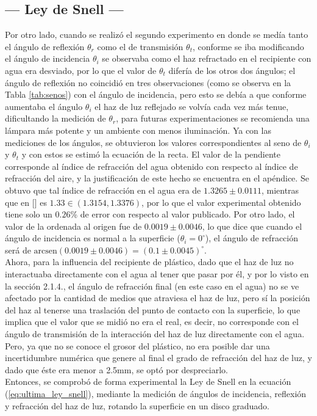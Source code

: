\documentclass[12pt,a4paper]{article}
\begin{document}
\subsection{--- Ley de Snell ---} %
\label{sub:ley_snell_conc}
Por otro lado, cuando se realizó el segundo experimento en donde se medía tanto el ángulo de reflexión $\theta_r$ como el de transmisión $\theta_t$, conforme se iba modificando el ángulo de incidencia $\theta_i$ se observaba como el haz refractado en el recipiente con agua era desviado, por lo que el valor de $\theta_t$ difería de los otros dos ángulos; el ángulo de reflexión no coincidió en tres observaciones (como se observa en la Tabla \ref{tab:senos}) con el ángulo de incidencia, pero esto se debía a que conforme aumentaba el ángulo $\theta_i$ el haz de luz reflejado se volvía cada vez más tenue, dificultando la medición de $\theta_r$, para futuras experimentaciones se recomienda una lámpara más potente y un ambiente con menos iluminación. Ya con las mediciones de los ángulos, se obtuvieron los valores correspondientes al seno de $\theta_i$ y $\theta_t$ y con estos se estimó la ecuación de la recta. El valor de la pendiente corresponde al índice de refracción del agua obtenido con respecto al índice de refracción del aire, y la justificación de este hecho se encuentra en el apéndice. Se obtuvo que tal índice de refracción en el agua era de $1.3265\pm 0.0111$, mientras que en \([\)\cite{resnick}\(]\) es $1.33\in \left(1.3154 ,1.3376\right)$, por lo que el valor experimental obtenido tiene solo un $0.26$\textsc{\%} de error con respecto al valor publicado. Por otro lado, el valor de la ordenada al origen fue de $0.0019\pm 0.0046$, lo que dice que cuando el ángulo de incidencia es normal a la superficie ($\theta_i=0^{\circ}$), el ángulo de refracción será de $\mbox{arcsen}(0.0019\pm 0.0046)=(0.1\pm0.0045)^{\circ}$.  \\[2mm]
Ahora, para la influencia del recipiente de plástico, dado que el haz de luz no interactuaba directamente con el agua al tener que pasar  por él, y por lo visto en la sección 2.1.4., el ángulo de refracción final (en este caso en el agua) no se ve afectado por la cantidad de medios que atraviesa el haz de luz, pero sí la posición del haz al tenerse una traslación del punto de contacto con la superficie, lo que implica que el valor que se midió no era el real, es decir, no corresponde con el ángulo de transmisión de la interacción del haz de luz directamente con el agua. Pero,  ya que no se conoce el grosor del plástico, no era posible dar una incertidumbre numérica que genere al final el grado de refracción del haz de luz, y dado que éste era menor a 2.5mm, se optó por despreciarlo. \\[2mm]
Entonces, se comprobó de forma experimental la Ley de Snell en la ecuación (\ref{eq:ultima_ley_snell}), mediante la medición de ángulos de incidencia, reflexión y refracción del haz de luz, rotando la superficie en un disco graduado.
\end{document}
